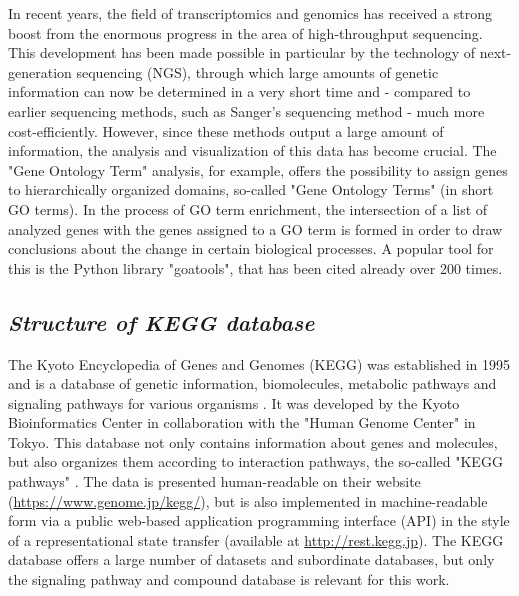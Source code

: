 \documentclass[11pt,a4paper]{article}
\begin{document}
In recent years, the field of transcriptomics and genomics has received a strong
boost from the enormous progress in the area of high-throughput sequencing. This
development has been made possible in particular by the technology of next-generation
sequencing (NGS), through which large amounts of genetic information can now be
determined in a very short time and - compared to earlier sequencing methods, such
as Sanger's sequencing method - much more cost-efficiently. However,
since these methods output a large amount of information, the analysis and visualization of this
data has become crucial. The "Gene Ontology Term" analysis, for example, offers the
possibility to assign genes to hierarchically organized domains, so-called "Gene
Ontology Terms" (in short GO terms)\cite{goterm}. In the process of GO term enrichment,
the intersection of a list of analyzed genes with the genes assigned to a GO term is
formed in order to draw conclusions about the change in certain biological processes.
A popular tool for this is the Python library "goatools", that has been cited
already over 200 times\cite{goatools}.


\subsection*{\textit{Structure of KEGG database}}

The Kyoto Encyclopedia of Genes and Genomes (KEGG) was established in 1995 and is a
database of genetic information, biomolecules, metabolic pathways and signaling
pathways for various organisms \cite{kegg1,kegg2}. It was developed by the Kyoto Bioinformatics
Center in collaboration with the "Human Genome Center" in Tokyo. This database not only
contains information about genes and molecules, but also organizes them according to
interaction pathways, the so-called "KEGG pathways" \cite{kegg2}. The data is presented
human-readable on their website (\mbox{\url{https://www.genome.jp/kegg/}}), but is also implemented
in machine-readable form via a public web-based application programming interface (API) in the
style of a representational state transfer (available at \mbox{\url{http://rest.kegg.jp}}).
The KEGG database offers a large number of
datasets and subordinate databases, but only the signaling pathway and compound database is relevant for this work.
\end{document}
